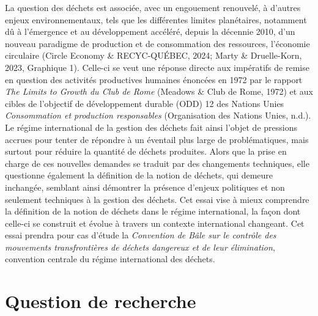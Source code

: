 \documentclass[12pt]{ulaval}
\begin{document}
La question des déchets est associée, avec un engouement renouvelé, à d'autres enjeux environnementaux, tels que les différentes limites planétaires, notamment dû à l'émergence et au développement accéléré, depuis la décennie 2010, d'un nouveau paradigme de production et de consommation des ressources, l'économie circulaire (Circle Economy \& RECYC-QUÉBEC, 2024; Marty \& Druelle-Korn, 2023, Graphique 1). Celle-ci se veut une réponse directe aux impératifs de remise en question des activités productives humaines énoncées en 1972 par le rapport \emph{The Limits to Growth du Club de Rome} (Meadows \& Club de Rome, 1972) et aux cibles de l'objectif de développement durable (ODD) 12 des Nations Unies \emph{Consommation et production responsables} (Organisation des Nations Unies, n.d.). Le régime international de la gestion des déchets fait ainsi l'objet de pressions accrues pour tenter de répondre à un éventail plus large de problématiques, mais surtout pour réduire la quantité de déchets produites. Alors que la prise en charge de ces nouvelles demandes se traduit par des changements techniques, elle questionne également la définition de la notion de déchets, qui demeure inchangée, semblant ainsi démontrer la présence d'enjeux politiques et non seulement techniques à la gestion des déchets. Cet essai vise à mieux comprendre la définition de la notion de déchets dans le régime international, la façon dont celle-ci se construit et évolue à travers un contexte international changeant. Cet essai prendra pour cas d'étude la \emph{Convention de Bâle sur le contrôle des mouvements transfrontières de déchets dangereux et de leur élimination}, convention centrale du régime international des déchets.

\section{Question de recherche}\label{question-de-recherche}
\end{document}
